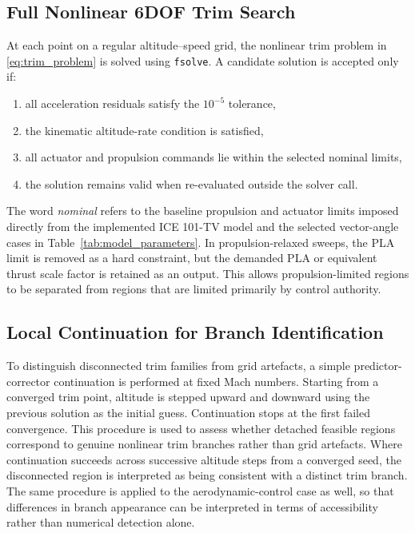 \documentclass[conf]{new-aiaa}
\begin{document}
\subsection{Full Nonlinear 6DOF Trim Search}
At each point on a regular altitude--speed grid, the nonlinear trim problem in \eqref{eq:trim_problem} is solved using \texttt{fsolve}. A candidate solution is accepted only if:
\begin{enumerate}
    \item all acceleration residuals satisfy the $10^{-5}$ tolerance,
    \item the kinematic altitude-rate condition is satisfied,
    \item all actuator and propulsion commands lie within the selected nominal limits,
    \item the solution remains valid when re-evaluated outside the solver call.
\end{enumerate}

The word \emph{nominal} refers to the baseline propulsion and actuator limits imposed directly from the implemented ICE 101-TV model and the selected vector-angle cases in Table~\ref{tab:model_parameters}. In propulsion-relaxed sweeps, the PLA limit is removed as a hard constraint, but the demanded PLA or equivalent thrust scale factor is retained as an output. This allows propulsion-limited regions to be separated from regions that are limited primarily by control authority.

\subsection{Local Continuation for Branch Identification}
To distinguish disconnected trim families from grid artefacts, a simple predictor-corrector continuation is performed at fixed Mach numbers. Starting from a converged trim point, altitude is stepped upward and downward using the previous solution as the initial guess. Continuation stops at the first failed convergence. This procedure is used to assess whether detached feasible regions correspond to genuine nonlinear trim branches rather than grid artefacts. Where continuation succeeds across successive altitude steps from a converged seed, the disconnected region is interpreted as being consistent with a distinct trim branch. The same procedure is applied to the aerodynamic-control case as well, so that differences in branch appearance can be interpreted in terms of accessibility rather than numerical detection alone.
\end{document}
